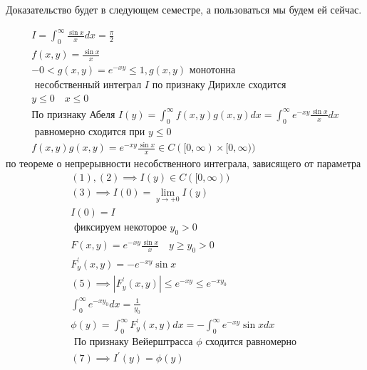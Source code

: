\documentclass[main]{subfiles}
\begin{document}
     \begin{longProof}
          Доказательство будет в следующем семестре, а пользоваться мы будем ей сейчас.
     \end{longProof}
     \begin{example}
          \begin{gather*}
               I = \int^\infty_0 \frac{\sin x}{x} dx = \frac{\pi}{2} \\
               f(x,y) = \frac{\sin x}{x} \\
              -0 < g(x,y) = e^{-xy} \leq 1, g(x,y) \text{ монотонна } \\
               \text{  несобственный интеграл }I \text{ по признаку Дирихле сходится} \\
               y \leq 0 \quad x \leq 0 \\ 
               \text{По признаку Абеля }
                I(y) = \int^\infty_0 f(x,y)g(x,y)dx = \int^\infty_0 e^{-xy} \frac{\sin x}{x}dx \\
                \text{ равномерно сходится при } y \leq 0 \\
               f(x,y)g(x,y) = e^{-xy} \frac{\sin x}{x} \in C([0,\infty) \times [0,\infty) ) \tag{2} \end{gather*}
          по теореме о непрерывности несобственного интеграла, зависящего от параметра
          \begin{gather*}
               (1),(2) \implies I(y) \in C([0,\infty)) \tag{3}\\
               (3) \implies I(0) = \underset{y \to +0}{\lim} I(y) \tag{4}\\
               I(0) = I \\
               \text{ фиксируем некоторое } y_0 > 0\\
               F(x,y) = e^{-xy} \frac{\sin x}{x} \quad y \geq y_0 > 0 \\
               F^\prime_y(x,y) = -e^{-xy} \sin x \tag{5} \\
               (5) \implies |F^\prime_y(x,y)| \leq e^{-xy} \leq e^{-xy_0} \tag{6} \\
               \int^\infty_0 e^{-xy_0} dx = \frac{1}{y_0} \\
               \phi(y) = \int^\infty_0 F^\prime_y(x,y) dx = -\int^\infty_0 e^{-xy} \sin x dx \tag{7}\\
               \text{ По признаку Вейерштрасса } \phi \text{ сходится равномерно } \\
               (7) \implies I^\prime(y) = \phi(y) \tag{8} \\

\end{gather*}
\end{example}
\end{document}
